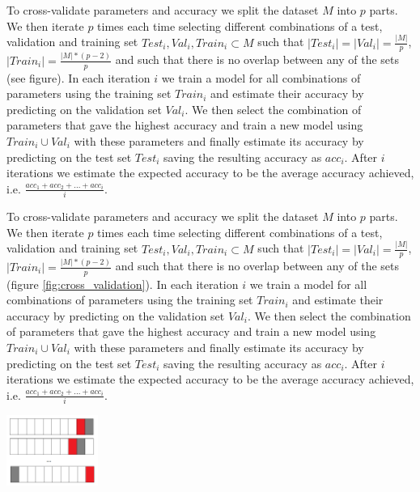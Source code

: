 \documentclass{article}
\begin{document}
To cross-validate parameters and accuracy we split the dataset $M$ into $p$ parts. We then iterate $p$ times each time selecting different combinations of a test, validation and training set $Test_i, Val_i, Train_i\subset M$ such that $|Test_i|=|Val_i|=\frac{|M|}{p}$,  $|Train_i| = \frac{|M| * (p-2)}{p}$ and such that there is no overlap between any of the sets (see figure). In each iteration $i$ we train a model for all combinations of parameters using the training set $Train_i$ and estimate their accuracy by predicting on the validation set $Val_i$. We then select the combination of parameters that gave the highest accuracy and train a new model using $Train_i\cup Val_i$ with these parameters and finally estimate its accuracy by predicting on the test set $Test_i$ saving the resulting accuracy as $acc_i$. After $i$ iterations we estimate the expected accuracy to be the average accuracy achieved, i.e. $\frac{acc_1 + acc_2 + ... + acc_i}{i}$.


\begin{minipage}{0.7\linewidth}
	To cross-validate parameters and accuracy we split the dataset $M$ into $p$ parts. We then iterate $p$ times each time selecting different combinations of a test, validation and training set $Test_i, Val_i, Train_i\subset M$ such that $|Test_i|=|Val_i|=\frac{|M|}{p}$,  $|Train_i| = \frac{|M| * (p-2)}{p}$ and such that there is no overlap between any of the sets (figure \ref{fig:cross_validation}). In each iteration $i$ we train a model for all combinations of parameters using the training set $Train_i$ and estimate their accuracy by predicting on the validation set $Val_i$. We then select the combination of parameters that gave the highest accuracy and train a new model using $Train_i\cup Val_i$ with these parameters and finally estimate its accuracy by predicting on the test set $Test_i$ saving the resulting accuracy as $acc_i$. After $i$ iterations we estimate the expected accuracy to be the average accuracy achieved, i.e. $\frac{acc_1 + acc_2 + ... + acc_i}{i}$.
\end{minipage}
\hspace{0.5cm}
\begin{minipage}[c]{0.3\linewidth}
	\centering
		\includegraphics[width=3cm]{10-fold-cross-validation_3}
		\label{fig:cross_validation}
\end{minipage}
\end{document}
